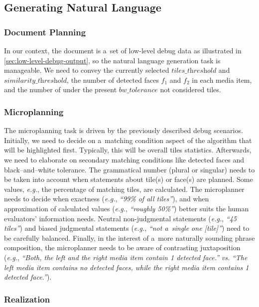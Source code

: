 \documentclass{article}
\begin{document}
\subsection{Generating Natural Language}

\subsubsection{Document Planning}

In our context, the document is a~set of low-level debug data
as illustrated in \autoref{sec:low-level-debug-output},
so the natural language generation task is manageable.
We need to convey the currently selected $\textit{tiles\_threshold}$
and $\textit{similarity\_threshold}$,
the number of detected faces $f_1$ and $f_2$ in each media item,
and the number of under the present $\textit{bw\_tolerance}$
not considered tiles.

\subsubsection{Microplanning}

The microplanning task is driven by the previously described debug scenarios.
Initially, we need to decide on a~matching condition aspect of the algorithm
that will be highlighted first.
Typically, this will be overall tiles statistics.
Afterwards, we need to elaborate on secondary matching conditions
like detected faces and black--and--white tolerance.
The grammatical number (plural or singular) needs to be taken into account
when statements about tile(s) or face(s) are planned.
Some values, \emph{e.g.}, the percentage of matching tiles, are calculated.
The microplanner needs to decide when exactness
(\emph{e.g.}, \textit{``99\% of all tiles''}),
and when approximation of calculated values
(\emph{e.g.}, \textit{``roughly 50\%''})
better suits the human evaluators' information needs.
Neutral non-judgmental statements
(\emph{e.g.}, \textit{``45 tiles''})
and biased judgmental statements
(\emph{e.g.}, \textit{``not a~single one [tile]''})
need to be carefully balanced.
Finally, in the interest of a~more naturally sounding phrase composition,
the microplanner needs to be aware of contrasting juxtaposition
(\emph{e.g.}, \textit{``Both, the left and the right media item contain 1 detected face.''} \emph{vs.}
\textit{``The left media item contains no detected faces, while the right media item contains 1 detected face.''}).

\subsubsection{Realization}
\end{document}
